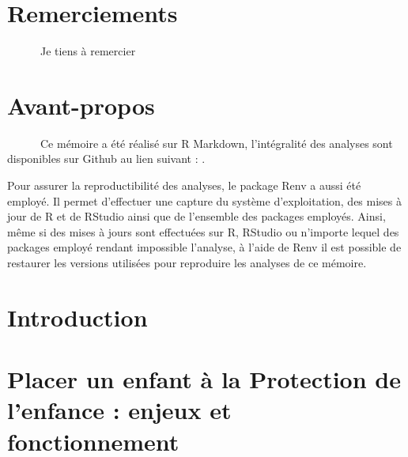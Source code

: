 \documentclass[
  12,
  a4paper,
]{report}
\begin{document}

{}
\chapter*{Remerciements}

\vspace{.5cm}

~~~~~~Je tiens à remercier

\newpage

{}
\chapter*{Avant-propos}

\vspace{.5cm}

~~~~~~Ce mémoire a été réalisé sur R Markdown, l'intégralité des
analyses sont disponibles sur Github au lien suivant : .

Pour assurer la reproductibilité des analyses, le package Renv a aussi
été employé. Il permet d'effectuer une capture du système
d'exploitation, des mises à jour de R et de RStudio ainsi que de
l'ensemble des packages employés. Ainsi, même si des mises à jours sont
effectuées sur R, RStudio ou n'importe lequel des packages employé
rendant impossible l'analyse, à l'aide de Renv il est possible de
restaurer les versions utilisées pour reproduire les analyses de ce
mémoire.

\newpage

\newpage
\begin{spacing}{1}
{}

\tableofcontents

\end{spacing}

\newpage
{}
\setlength{\parskip}{1em}

\newpage

{}
\chapter*{\huge Introduction}

\vspace{.5cm}

\newpage

\hypertarget{placer-un-enfant-uxe0-la-protection-de-lenfance-enjeux-et-fonctionnement}{%
\chapter{Placer un enfant à la Protection de l'enfance : enjeux et
fonctionnement}\label{placer-un-enfant-uxe0-la-protection-de-lenfance-enjeux-et-fonctionnement}}
\end{document}
